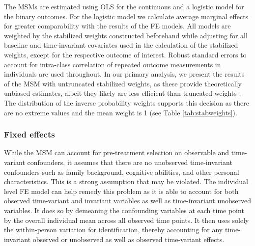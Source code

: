 The \acp{MSM} are estimated using \ac{OLS} for the continuous and a logistic model for the binary outcomes. For the logistic model we calculate average marginal effects for greater comparability with the results of the \ac{FE} models. All models are weighted by the stabilized weights constructed beforehand while adjusting for all baseline and time-invariant covariates used in the calculation of the stabilized weights, except for the respective outcome of interest. Robust standard errors to account for intra-class correlation of repeated outcome measurements in individuals are used throughout. In our primary analysis, we present the results of the \ac{MSM} with untruncated stabilized weights, as these provide theoretically unbiased estimates, albeit they likely are less efficient than truncated weights \parencite{Cole2008}. The distribution of the inverse probability weights supports this decision as there are no extreme values and the mean weight is 1 (see Table \ref{tab:stabweights}).

\subsubsection*{Fixed effects}

While the \ac{MSM} can account for pre-treatment selection on observable and time-variant confounders, it assumes that there are no unobserved time-invariant confounders such as family background, cognitive abilities, and other personal characteristics. This is a strong assumption that may be violated. The individual level \ac{FE} model can help remedy this problem as it is able to account for both observed time-variant and invariant variables as well as time-invariant unobserved variables. It does so by demeaning the confounding variables at each time point by the overall individual mean across all observed time points. It then uses solely the within-person variation for identification, thereby accounting for any time-invariant observed or unobserved as well as observed time-variant effects. 

